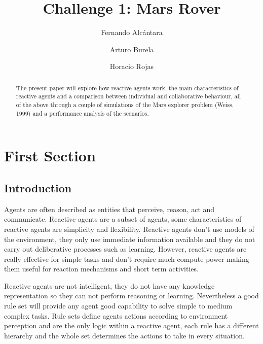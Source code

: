 \documentclass[runningheads]{llncs}
\begin{document}
%
\title{Challenge 1: Mars Rover}
%
%
\author{Fernando Alcántara \and
Arturo Burela \and
Horacio Rojas}
%
%
%
\maketitle              %
%
\begin{abstract}
The present paper will explore how reactive agents work, the main characteristics of reactive agents and a comparison between individual and collaborative behaviour,
all of the above through a couple of simulations of the Mars explorer problem (Weiss, 1999) and a performance analysis of the scenarios.

\end{abstract}
%
%
%
\section{First Section}
\subsection{Introduction}

Agents are often described as entities that perceive, reason, act and communicate. Reactive agents are a subset of agents, some characteristics of reactive agents are simplicity and flexibility. Reactive agents don't use models of the environment, they only use immediate information available and they do not carry out deliberative processes such as learning. However, reactive agents are really effective for simple tasks and don't require much compute power making them useful for reaction mechanisms and short term activities.

Reactive agents are not intelligent, they do not have any knowledge representation so they can not perform reasoning or learning. Nevertheless a good rule set will provide any agent good capability to solve simple to medium complex tasks. Rule sets define agents actions according to environment perception and are the only logic within a reactive agent, each rule has a different hierarchy and the whole set determines the actions to take in every situation.
\end{document}
